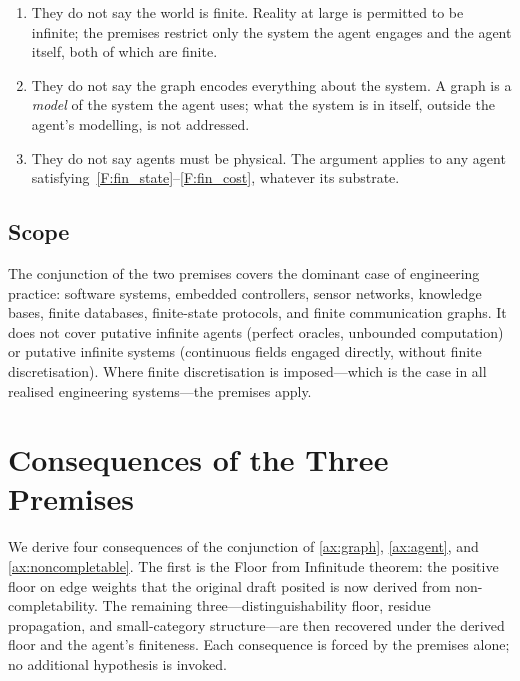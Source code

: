 \documentclass[11pt,a4paper]{article}
\theoremstyle{thmstyle}
\theoremstyle{definition}
\theoremstyle{remark}
\begin{document}
\begin{enumerate}[nosep,leftmargin=*]
\item They do not say the world is finite. Reality at large is
permitted to be infinite; the premises restrict only the system the
agent engages and the agent itself, both of which are finite.
\item They do not say the graph encodes everything about the system.
A graph is a \emph{model} of the system the agent uses; what the
system is in itself, outside the agent's modelling, is not
addressed.
\item They do not say agents must be physical. The argument applies
to any agent satisfying~\ref{F:fin_state}--\ref{F:fin_cost},
whatever its substrate.
\end{enumerate}

\subsection{Scope}

The conjunction of the two premises covers the dominant case of
engineering practice: software systems, embedded controllers,
sensor networks, knowledge bases, finite databases, finite-state
protocols, and finite communication graphs. It does not cover
putative infinite agents (perfect oracles, unbounded computation) or
putative infinite systems (continuous fields engaged directly,
without finite discretisation). Where finite discretisation is
imposed---which is the case in all realised engineering
systems---the premises apply.

\section{Consequences of the Three Premises}
\label{sec:consequences}

We derive four consequences of the conjunction of \cref{ax:graph},
\cref{ax:agent}, and \cref{ax:noncompletable}. The first is the
Floor from Infinitude theorem: the positive floor on edge weights
that the original draft posited is now derived from
non-completability. The remaining three---distinguishability floor,
residue propagation, and small-category structure---are then
recovered under the derived floor and the agent's finiteness. Each
consequence is forced by the premises alone; no additional
hypothesis is invoked.
\end{document}

